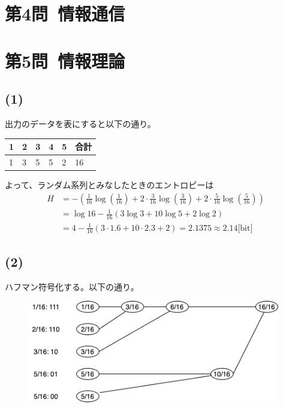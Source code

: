 \documentclass[a4paper,12pt,xelatex,ja=standard]{bxjsarticle}
\begin{document}
\section*{第4問\ 情報通信}

\section*{第5問\ 情報理論}
\subsection*{(1)}
出力のデータを表にすると以下の通り。

\begin{table}[H]
  \centering
  \begin{tabular}{|l|l|l|l|l|l|}
  \hline
  1 & 2 & 3 & 4 & 5 & 合計 \\ \hline
  1 & 3 & 5 & 5 & 2 & 16 \\ \hline
  \end{tabular}
\end{table}

よって、ランダム系列とみなしたときのエントロピーは
\begin{equation*}
  \begin{split}
    H
      &= - (\frac{1}{16} \log (\frac{1}{16}) + 2 \cdot \frac{3}{16}\log (\frac{3}{16}) + 2 \cdot \frac{5}{16} \log (\frac{5}{16}))\\
      &= \log 16 - \frac{1}{16} (3 \log 3 + 10 \log 5 + 2 \log 2) \\
      &= 4 - \frac{1}{16}(3 \cdot 1.6 + 10 \cdot 2.3 + 2) = 2.1375 \approx 2.14 \text{[bit]}
  \end{split}
\end{equation*}

\subsection*{(2)}
ハフマン符号化する。以下の通り。

\begin{figure}[H]
  \centering
  \includegraphics[width=11cm]{images/2017_huffman_tree.png}
\end{figure}
\end{document}
